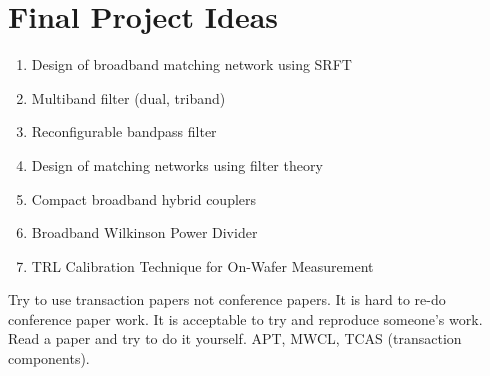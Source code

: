 \documentclass{article}
\begin{document}
\section*{Final Project Ideas}
\begin{enumerate}
    \item Design of broadband matching network using SRFT
    \item Multiband filter (dual, triband)
    \item Reconfigurable bandpass filter
    \item Design of matching networks using filter theory
    \item Compact broadband hybrid couplers
    \item Broadband Wilkinson Power Divider
    \item TRL Calibration Technique for On-Wafer Measurement
\end{enumerate}

Try to use transaction papers not conference papers. It is hard to re-do
conference paper work. It is acceptable to try and reproduce someone's
work. Read a paper and try to do it yourself. APT, MWCL, TCAS
(transaction components).
\end{document}
